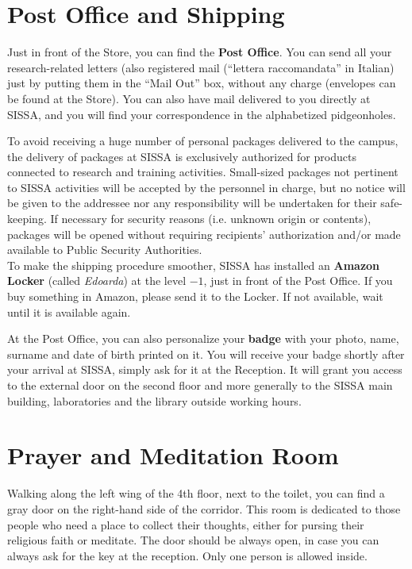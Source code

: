 \documentclass{sissavademecum}
\begin{document}
\section{Post Office and Shipping}

Just in front of the Store, you can find the \textbf{Post Office}. You can send all your research-related letters (also registered mail (``lettera raccomandata'' in Italian) just by putting them in the ``Mail Out'' box, without any charge (envelopes can be found at the Store). You can also have mail delivered to you directly at SISSA, and you will find your correspondence in the alphabetized pidgeonholes.

To avoid receiving a huge number of personal packages delivered to the campus, the delivery of packages at SISSA is exclusively authorized for products connected to research and training activities. Small-sized packages not pertinent to SISSA activities will be accepted by the personnel in charge, but no notice will be given to the addressee nor any responsibility will be undertaken for their safe-keeping. If necessary for security reasons (i.e. unknown origin or contents), packages will be opened without requiring recipients' authorization and/or made available to Public Security Authorities.\\
To make the shipping procedure smoother, SISSA has installed an \textbf{Amazon Locker} (called \emph{Edoarda}) at the level $-1$, just in front of the Post Office. If you buy something in Amazon, please send it to the Locker. If not available, wait until it is available again. 


At the Post Office, you can also personalize your \hypertarget{Badge}{}\textbf{badge} with your photo, name, surname and date of birth printed on it. You will receive your badge shortly after your arrival at SISSA, simply ask for it at the Reception. It will grant you access to the external door on the second floor and more generally to the SISSA main building, laboratories and the library outside working hours.


\section{Prayer and Meditation Room}

Walking along the left wing of the 4th floor, next to the toilet, you can find a gray door on the right-hand side of the corridor. This room is dedicated to those people who need a place to collect their thoughts, either for pursing their religious faith or meditate. The door should be always open, in case you can always ask for the key at the reception. Only one person is allowed inside.
\end{document}
